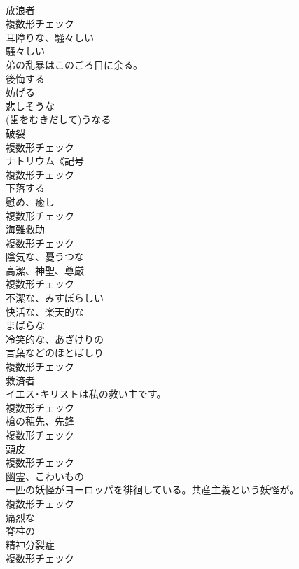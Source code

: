 \documentclass[8pt]{extreport}
\begin{document}
\begin{CJK}{UTF8}{min}
\\	[名詞]	放浪者	
\\	複数形チェック
\\	[形容詞]	耳障りな、騒々しい	
\\	[形容詞]	騒々しい	
\\	弟の乱暴はこのごろ目に余る。	
\\	[動詞]	後悔する	
\\	[動詞]	妨げる	
\\	[形容詞]	悲しそうな	
\\	[動詞]	(⻭をむきだして)うなる	
\\	[名詞]	破裂	
\\	複数形チェック
\\	[名詞]	ナトリウム《記号
\\	複数形チェック
\\	[動詞]	下落する	
\\	[名詞]	慰め、癒し	
\\	複数形チェック
\\	[名詞]	海難救助	
\\	複数形チェック
\\	[形容詞]	陰気な、憂うつな	
\\	[名詞]	高潔、神聖、尊厳	
\\	複数形チェック
\\	[形容詞]	不潔な、みすぼらしい	
\\	[形容詞]	快活な、楽天的な	
\\	[形容詞]	まばらな	
\\	[形容詞]	冷笑的な、あざけりの	
\\	[名詞]	言葉などのほとばしり	
\\	複数形チェック
\\	[名詞]	救済者	
\\	イエス･キリストは私の救い主です。	
\\	複数形チェック
\\	[名詞]	槍の穂先、先鋒	
\\	複数形チェック
\\	[名詞]	頭皮	
\\	複数形チェック
\\	[名詞]	幽霊、こわいもの	
\\	一匹の妖怪がヨーロッパを徘徊している。共産主義という妖怪が。	
\\	複数形チェック
\\	[形容詞]	痛烈な	
\\	[形容詞]	脊柱の	
\\	[名詞]	精神分裂症	
\\	複数形チェック

\end{CJK}
\end{document}
